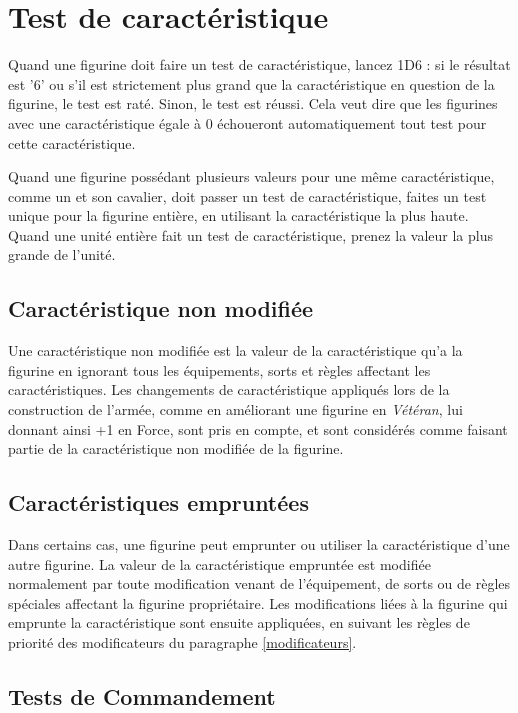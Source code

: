 \section{Test de caractéristique}

Quand une figurine doit faire un test de caractéristique, lancez 1D6 : si le résultat est '6' ou s'il est strictement plus grand que la caractéristique en question de la figurine, le test est raté. Sinon, le test est réussi. Cela veut dire que les figurines avec une caractéristique égale à 0 échoueront automatiquement tout test pour cette caractéristique.

Quand une figurine possédant plusieurs valeurs pour une même caractéristique, comme un  et son cavalier, doit passer un test de caractéristique, faites un test unique pour la figurine entière, en utilisant la caractéristique la plus haute. Quand une unité entière fait un test de caractéristique, prenez la valeur la plus grande de l'unité.

\subsection{Caractéristique non modifiée}

Une caractéristique non modifiée est la valeur de la caractéristique qu'a la figurine en ignorant tous les équipements, sorts et règles affectant les caractéristiques. Les changements de caractéristique appliqués lors de la construction de l'armée, comme en améliorant une figurine en \emph{Vétéran}, lui donnant ainsi +1 en Force, sont pris en compte, et sont considérés comme faisant partie de la caractéristique non modifiée de la figurine.

\subsection{Caractéristiques empruntées}

Dans certains cas,  une figurine peut emprunter ou utiliser la caractéristique d'une autre figurine. La valeur de la caractéristique empruntée est modifiée normalement par toute modification venant de l'équipement, de sorts ou de règles spéciales affectant la figurine propriétaire. Les modifications liées à la figurine qui emprunte la caractéristique sont ensuite appliquées, en suivant les règles de priorité des modificateurs du paragraphe \ref{modificateurs}.

\subsection{Tests de Commandement}

